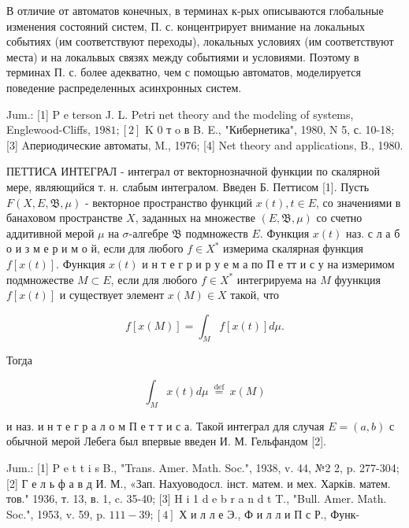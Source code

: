 \documentclass[10pt]{article}
\begin{document}
В отличие от автоматов конечных, в терминах к-рых описываются глобальные изменения состояний систем, П. с. концентрирует внимание на локальных событиях (им соответствуют переходы), локальных условиях (им соответствуют места) и на локальвых связях между событиями и условиями. Поэтому в терминах П. с. более адекватно, чем с помощью автоматов, моделируется поведение распределенных асинхронных систем.



Jum.: [1] P e terson J. L. Petri net theory and the modeling of systems, Englewood-Cliffs, $1981 ;[2]$ K 0 т o в B. E., "Кибернетика", 1980, N 5, с. 10-18; [3] Aпериодические автоматы, M., 1976; [4] Net theory and applications, B., 1980.



ПЕТТИСА ИНТЕГРАЛ - интеграл от векторнозначной функции по скалярной мере, являющийся т. н. слабым интегралом. Введен Б. Петтисом [1]. Пусть $F(X, E, \mathfrak{B}, \mu)$ - векторное пространство функций $x(t), t \in E$, со значениями в банаховом пространстве $X$, заданных на множестве $(E, \mathfrak{B}, \mu)$ со счетно аддитивной мерой $\mu$ на $\sigma$-алгебре $\mathfrak{B}$ подмножеств $E$. Функция $x(t)$ наз. с л а б о и з м е р и м о й, если для любого $f \in X^{*}$ измерима скалярная функция $f[x(t)]$. Функция $x(t)$ и н т е г р и р у е м а по П е тт и с у на измеримом подмножестве $M \subset E$, если для любого $f \in X^{*}$ интегрируема на $M$ фуункция $f[x(t)]$ и существует элемент $x(M) \in X$ такой, что



\[

f[x(M)]=\int_{M} f[x(t)] d \mu .

\]



Тогда



\[

\int_{M} x(t) d \mu \stackrel{\text { def }}{=} x(M)

\]



и наз. и н т е г р а л о м П е т т и с а. Такой интеграл для случая $E=(a, b)$ с обычной мерой Лебега был впервые введен И. М. Гельфандом [2].



Jum.: [1] P e t t i s B., "Trans. Amer. Math. Soc.", 1938, v. 44, №2 2, p. 277-304; [2] Г е л ь ф а в д И. М., «Зап. Нахуоводосл. інст. матем. и мех. Харків. матем. тов." 1936, т. 13, в. 1, c. 35-40; [3] H i 1 d e b r a n d t T., "Bull. Amer. Math. Soc.", 1953, v. 59, p. $111-39 ;[4]$ Х и л л е Э., Ф и л л и П с Р., Функ-
\end{document}

